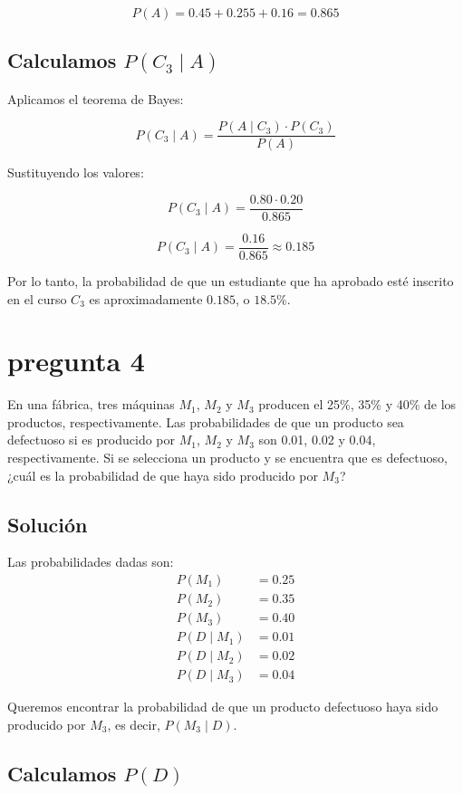 \documentclass[12pt,a4paper]{article}
\begin{document}
\[
P(A) = 0.45 + 0.255 + 0.16 = 0.865
\]

\subsection*{ Calculamos \( P(C_3 \mid A) \)}

Aplicamos el teorema de Bayes:

\[
P(C_3 \mid A) = \frac{P(A \mid C_3) \cdot P(C_3)}{P(A)}
\]

Sustituyendo los valores:

\[
P(C_3 \mid A) = \frac{0.80 \cdot 0.20}{0.865}
\]

\[
P(C_3 \mid A) = \frac{0.16}{0.865} \approx 0.185
\]

Por lo tanto, la probabilidad de que un estudiante que ha aprobado esté inscrito en el curso \( C_3 \) es aproximadamente \( 0.185 \), o \( 18.5\% \).

\section*{pregunta 4}
En una fábrica, tres máquinas \( M_1 \), \( M_2 \) y \( M_3 \) producen el 25\%, 35\% y 40\% de los productos, respectivamente. Las probabilidades de que un producto sea defectuoso si es producido por \( M_1 \), \( M_2 \) y \( M_3 \) son 0.01, 0.02 y 0.04, respectivamente. Si se selecciona un producto y se encuentra que es defectuoso, ¿cuál es la probabilidad de que haya sido producido por \( M_3 \)?

\subsection*{Solución}


Las probabilidades dadas son:
\begin{align*}
P(M_1) &= 0.25 \\
P(M_2) &= 0.35 \\
P(M_3) &= 0.40 \\
P(D \mid M_1) &= 0.01 \\
P(D \mid M_2) &= 0.02 \\
P(D \mid M_3) &= 0.04
\end{align*}

Queremos encontrar la probabilidad de que un producto defectuoso haya sido producido por \( M_3 \), es decir, \( P(M_3 \mid D) \).

\subsection*{Calculamos \( P(D) \)}
\end{document}

